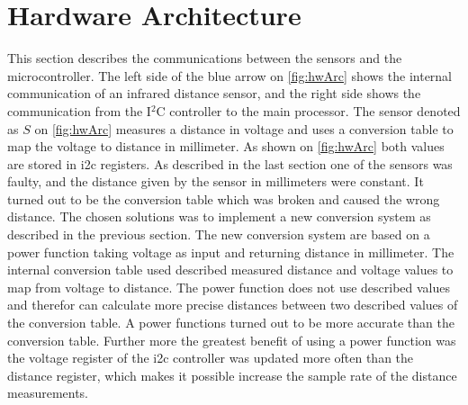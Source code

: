 \section{Hardware Architecture}\label{sec:arch}
This section describes the communications between the sensors and the microcontroller. The left side of the blue arrow on \cref{fig:hwArc} shows the internal communication of an infrared distance sensor, and the right side shows the communication from the I$^2$C controller to the main processor. The sensor denoted as $S$ on \cref{fig:hwArc} measures a distance in voltage and uses a conversion table to map the voltage to distance in millimeter. As shown on \cref{fig:hwArc} both values are stored in i2c registers. As described in the last section one of the sensors was faulty, and the distance given by the sensor in millimeters were constant. It turned out to be the conversion table which was broken and caused the wrong distance. The chosen solutions was to implement a new conversion system as described in the previous section.
 The new conversion system are based on a power function taking voltage as input and returning distance in millimeter. The internal conversion table used described measured distance and voltage values to map from voltage to distance. The power function does not use described values and therefor can calculate more precise distances between two described values of the conversion table.
A power functions turned out to be more accurate than the conversion table. Further more the greatest benefit of using a power function was the voltage register of the i2c controller was updated more often than the distance register, which makes it possible increase the sample rate of the distance measurements. 

